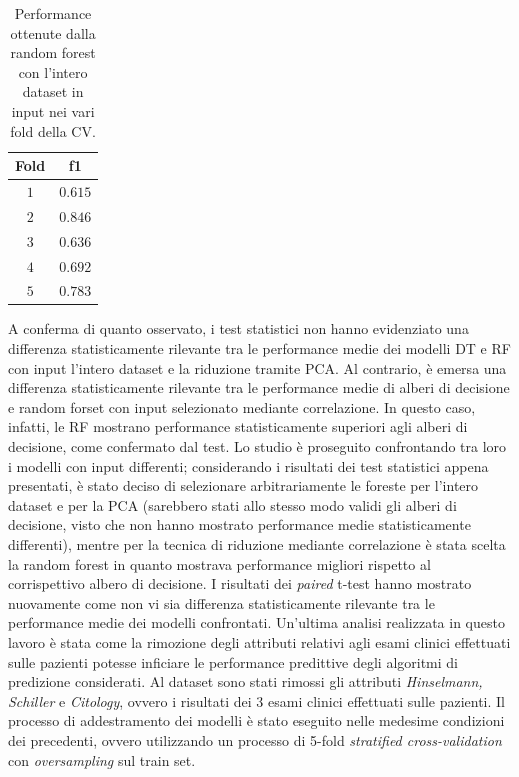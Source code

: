\begin{table}
	\centering
	\caption{Performance ottenute dalla random forest con l'intero dataset in input nei vari fold della CV.}
	\label{tab:f1fold}
	\begin{tabular}{|c|c|}
		\hline 
		Fold & f1 \\ 
		\hline 
		$1$ & $0.615$ \\ 
		\hline 
		$2$ & $0.846$ \\ 
		\hline 
		$3$ & $0.636$ \\ 
		\hline 
		$4$ & $0.692$ \\ 
		\hline 
		$5$ & $0.783$ \\ 
		\hline 
	\end{tabular} 
\end{table}
A conferma di quanto osservato, i test statistici non hanno evidenziato una differenza statisticamente rilevante tra le performance medie dei modelli DT e RF con input l'intero dataset e la riduzione tramite PCA. Al contrario, è emersa una differenza statisticamente rilevante tra le performance medie di alberi di decisione e random forset con input selezionato mediante correlazione. In questo caso, infatti, le RF mostrano performance statisticamente superiori agli alberi di decisione, come confermato dal test.
Lo studio è proseguito confrontando tra loro i modelli con input differenti; considerando i risultati dei test statistici appena presentati, è stato deciso di selezionare arbitrariamente le foreste per l'intero dataset e per la PCA (sarebbero stati allo stesso modo validi gli alberi di decisione, visto che non hanno mostrato performance medie statisticamente differenti), mentre per la tecnica di riduzione mediante correlazione è stata scelta la random forest in quanto mostrava performance migliori rispetto al corrispettivo albero di decisione. I risultati dei \textit{paired} t-test hanno mostrato nuovamente come non vi sia differenza statisticamente rilevante tra le performance medie dei modelli confrontati.
Un'ultima analisi realizzata in questo lavoro è stata come la rimozione degli attributi relativi agli esami clinici effettuati sulle pazienti potesse inficiare le performance predittive degli algoritmi di predizione considerati. Al dataset sono stati rimossi gli attributi \textit{Hinselmann, Schiller} e \textit{Citology}, ovvero i risultati dei 3 esami clinici effettuati sulle pazienti. Il processo di addestramento dei modelli è stato eseguito nelle medesime condizioni dei precedenti, ovvero utilizzando un processo di 5-fold \textit{stratified cross-validation} con \textit{oversampling} sul train set.
